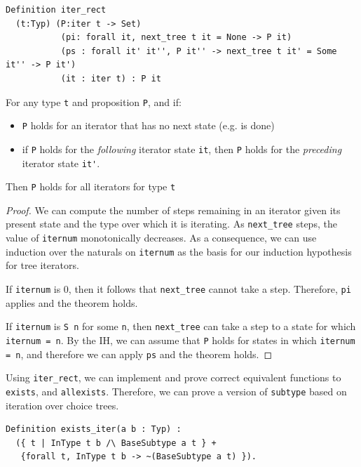\documentclass[a4paper,english]{lipics-v2019}
\begin{document}
\begin{theorem}
\begin{small}\begin{verbatim}
Definition iter_rect
  (t:Typ) (P:iter t -> Set)
           (pi: forall it, next_tree t it = None -> P it)
           (ps : forall it' it'', P it'' -> next_tree t it' = Some it'' -> P it')
           (it : iter t) : P it  
\end{verbatim}\end{small}

For any type \verb|t| and proposition \verb|P|, and if: \begin{itemize}
\item \verb|P| holds for an iterator that has no next state (e.g. is done)
\item if \verb|P| holds for the \emph{following} iterator state \verb|it|,
then \verb|P| holds for the \emph{preceding} iterator state \verb|it'|.
\end{itemize} Then \verb|P| holds for all iterators for type \verb|t|
\end{theorem} \begin{proof} We can compute the number of steps remaining in an
iterator given its present state and the type over which it is iterating. As
\verb|next_tree| steps, the value of \verb|iternum| monotonically decreases.
As a consequence, we can use induction over the naturals on \verb|iternum| as
the basis for our induction hypothesis for tree iterators.

If \verb|iternum| is 0, then it follows that \verb|next_tree| cannot take a
step. Therefore, \verb|pi| applies and the theorem holds.

If \verb|iternum| is \verb|S n| for some \verb|n|, then \verb|next_tree| can
take a step to a state for which \verb|iternum = n|. By the IH, we can assume
that \verb|P| holds for states in which \verb|iternum = n|,  and therefore we
can apply \verb|ps| and the theorem holds. \end{proof}

Using \verb|iter_rect|, we can implement and prove correct equivalent functions
to \verb|exists|, and \verb|allexists|. Therefore, we can prove a version of \verb|subtype|
based on iteration over choice trees.
\begin{small}\begin{verbatim}
Definition exists_iter(a b : Typ) : 
  ({ t | InType t b /\ BaseSubtype a t } +
   {forall t, InType t b -> ~(BaseSubtype a t) }).
\end{verbatim}\end{small}
\end{document}
